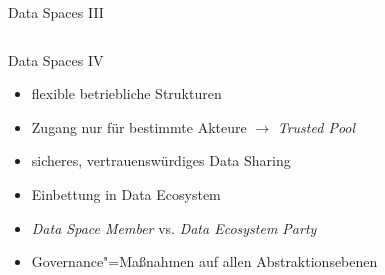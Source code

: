 \begin{frame}{Data Spaces III \footnotesize\cite{mollerIndustrialDataEcosystems2024}}
\begin{columns}
        \begin{column}{0.4\textwidth}
        \end{column}
    \end{columns}
\end{frame}


\begin{frame}{Data Spaces IV \footnotesize\cite{mollerIndustrialDataEcosystems2024}}

    \begin{itemize}
        \item flexible betriebliche Strukturen
        \item Zugang nur für bestimmte Akteure $\to$ \emph{Trusted Pool}
        \item sicheres, vertrauenswürdiges Data Sharing
        
        \pause
        \item Einbettung in Data Ecosystem
        \item \emph{Data Space Member} vs. \emph{Data Ecosystem Party}
        
        \pause
        \item Governance"=Maßnahmen auf allen Abstraktionsebenen
    \end{itemize}
    
    
\end{frame}

